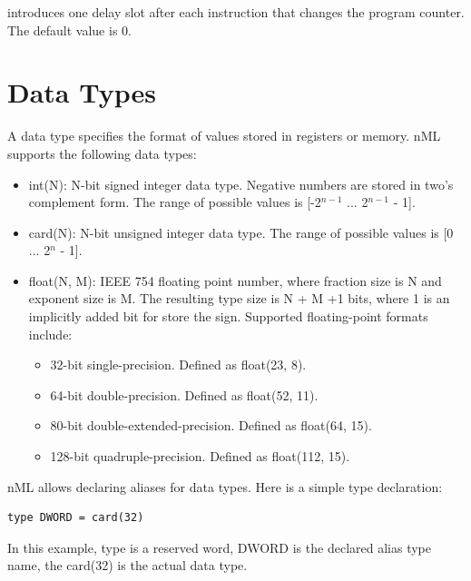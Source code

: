 \documentclass[oneside,final,14pt]{extreport}
\begin{document}
introduces one delay slot after each instruction that changes the program counter. The default
value is 0.


\section{Data Types}

A data type specifies the format of values stored in registers or memory. nML supports
the following data types: 

\begin{itemize}

\item int(N):
N-bit signed integer data type. Negative numbers are stored in two's complement
form. The range of possible values is [-2$^{n-1}$ ... 2$^{n-1}$ - 1].

\item card(N):
N-bit unsigned integer data type. The range of possible values is [0 ... 2$^n$ - 1].

\item float(N, M): IEEE 754 floating point number, where fraction size is N and exponent size is M.
The resulting type size is N + M +1 bits, where 1 is an implicitly added bit for store the sign.
Supported floating-point formats include:

\begin{itemize}
\item 32-bit single-precision. Defined as float(23, 8).
\item 64-bit double-precision. Defined as float(52, 11).
\item 80-bit double-extended-precision. Defined as float(64, 15).
\item 128-bit quadruple-precision. Defined as float(112, 15).
\end{itemize}

\end{itemize}

nML allows declaring aliases for data types. Here is a simple type declaration:

\begin{lstlisting}
type DWORD = card(32)
\end{lstlisting}

In this example, type is a reserved word, DWORD is the declared alias type name, the card(32) is
the actual data type.
\end{document}

